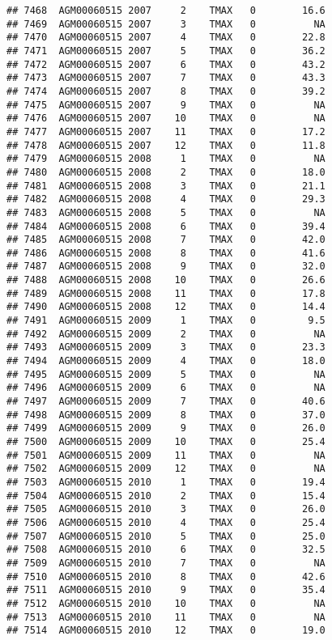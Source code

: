 \documentclass{article}\usepackage[]{graphicx}\usepackage[]{color}
\makeatletter
\newenvironment{kframe}{%
 \def\at@end@of@kframe{}%
 \ifinner\ifhmode%
  \def\at@end@of@kframe{\end{minipage}}%
  \begin{minipage}{\columnwidth}%
 \fi\fi%
 \def\FrameCommand##1{\hskip\@totalleftmargin \hskip-\fboxsep
 \colorbox{shadecolor}{##1}\hskip-\fboxsep
     \hskip-\linewidth \hskip-\@totalleftmargin \hskip\columnwidth}%
 \MakeFramed {\advance\hsize-\width
   \@totalleftmargin\z@ \linewidth\hsize
   \@setminipage}}%
 {\par\unskip\endMakeFramed%
 \at@end@of@kframe}
\newenvironment{knitrout}{}{} %
\makeatother
\begin{document}
\begin{knitrout}
\begin{kframe}
\begin{verbatim}
## 7468  AGM00060515 2007     2    TMAX   0        16.6
## 7469  AGM00060515 2007     3    TMAX   0          NA
## 7470  AGM00060515 2007     4    TMAX   0        22.8
## 7471  AGM00060515 2007     5    TMAX   0        36.2
## 7472  AGM00060515 2007     6    TMAX   0        43.2
## 7473  AGM00060515 2007     7    TMAX   0        43.3
## 7474  AGM00060515 2007     8    TMAX   0        39.2
## 7475  AGM00060515 2007     9    TMAX   0          NA
## 7476  AGM00060515 2007    10    TMAX   0          NA
## 7477  AGM00060515 2007    11    TMAX   0        17.2
## 7478  AGM00060515 2007    12    TMAX   0        11.8
## 7479  AGM00060515 2008     1    TMAX   0          NA
## 7480  AGM00060515 2008     2    TMAX   0        18.0
## 7481  AGM00060515 2008     3    TMAX   0        21.1
## 7482  AGM00060515 2008     4    TMAX   0        29.3
## 7483  AGM00060515 2008     5    TMAX   0          NA
## 7484  AGM00060515 2008     6    TMAX   0        39.4
## 7485  AGM00060515 2008     7    TMAX   0        42.0
## 7486  AGM00060515 2008     8    TMAX   0        41.6
## 7487  AGM00060515 2008     9    TMAX   0        32.0
## 7488  AGM00060515 2008    10    TMAX   0        26.6
## 7489  AGM00060515 2008    11    TMAX   0        17.8
## 7490  AGM00060515 2008    12    TMAX   0        14.4
## 7491  AGM00060515 2009     1    TMAX   0         9.5
## 7492  AGM00060515 2009     2    TMAX   0          NA
## 7493  AGM00060515 2009     3    TMAX   0        23.3
## 7494  AGM00060515 2009     4    TMAX   0        18.0
## 7495  AGM00060515 2009     5    TMAX   0          NA
## 7496  AGM00060515 2009     6    TMAX   0          NA
## 7497  AGM00060515 2009     7    TMAX   0        40.6
## 7498  AGM00060515 2009     8    TMAX   0        37.0
## 7499  AGM00060515 2009     9    TMAX   0        26.0
## 7500  AGM00060515 2009    10    TMAX   0        25.4
## 7501  AGM00060515 2009    11    TMAX   0          NA
## 7502  AGM00060515 2009    12    TMAX   0          NA
## 7503  AGM00060515 2010     1    TMAX   0        19.4
## 7504  AGM00060515 2010     2    TMAX   0        15.4
## 7505  AGM00060515 2010     3    TMAX   0        26.0
## 7506  AGM00060515 2010     4    TMAX   0        25.4
## 7507  AGM00060515 2010     5    TMAX   0        25.0
## 7508  AGM00060515 2010     6    TMAX   0        32.5
## 7509  AGM00060515 2010     7    TMAX   0          NA
## 7510  AGM00060515 2010     8    TMAX   0        42.6
## 7511  AGM00060515 2010     9    TMAX   0        35.4
## 7512  AGM00060515 2010    10    TMAX   0          NA
## 7513  AGM00060515 2010    11    TMAX   0          NA
## 7514  AGM00060515 2010    12    TMAX   0        19.0

\end{verbatim}
\end{kframe}
\end{knitrout}
\end{document}

